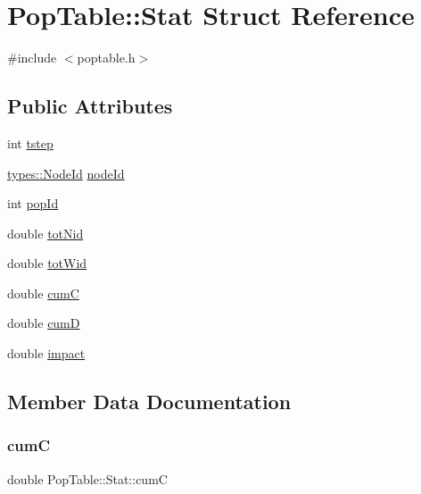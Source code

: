 \hypertarget{struct_pop_table_1_1_stat}{}\section{Pop\+Table\+::Stat Struct Reference}
\label{struct_pop_table_1_1_stat}


{\ttfamily \#include $<$poptable.\+h$>$}

\subsection*{Public Attributes}
\begin{DoxyCompactItemize}
\item 
int \mbox{\hyperlink{struct_pop_table_1_1_stat_a1978d9f24f84c110c7812ab972ee3bf8}{tstep}}
\item 
\mbox{\hyperlink{classtypes_1_1_node_id}{types\+::\+Node\+Id}} \mbox{\hyperlink{struct_pop_table_1_1_stat_ae81bf6fe27ebe4337198f8022812dd9e}{node\+Id}}
\item 
int \mbox{\hyperlink{struct_pop_table_1_1_stat_a6c4c681efec49ee5e670bf9b923954a5}{pop\+Id}}
\item 
double \mbox{\hyperlink{struct_pop_table_1_1_stat_ab59bd91f9526aa08a255f261d95aa6c0}{tot\+Nid}}
\item 
double \mbox{\hyperlink{struct_pop_table_1_1_stat_a41ae97039ad5625859541b4d61884a15}{tot\+Wid}}
\item 
double \mbox{\hyperlink{struct_pop_table_1_1_stat_ab2016bd79ff0cf3fac6233bdf916f760}{cumC}}
\item 
double \mbox{\hyperlink{struct_pop_table_1_1_stat_a92e9fcff933500c86ab33a34c5b07c18}{cumD}}
\item 
double \mbox{\hyperlink{struct_pop_table_1_1_stat_aa988c8b3b9ec60f00d22f08cfff9b269}{impact}}
\end{DoxyCompactItemize}


\subsection{Member Data Documentation}
\mbox{\label{struct_pop_table_1_1_stat_ab2016bd79ff0cf3fac6233bdf916f760}} 
\subsubsection{\texorpdfstring{cumC}{cumC}}
{\footnotesize\ttfamily double Pop\+Table\+::\+Stat\+::cumC}

